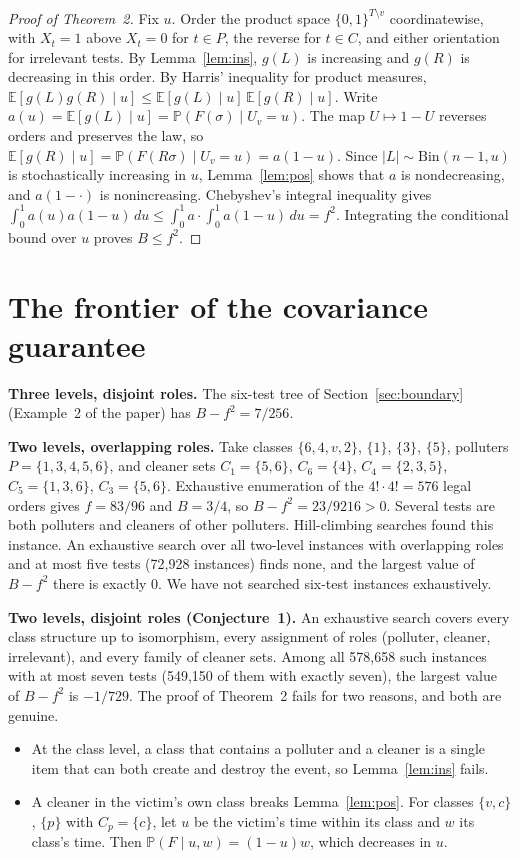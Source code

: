 \documentclass[11pt,a4paper]{article}
\theoremstyle{definition}\newtheorem{definition}[theorem]{Definition}
\theoremstyle{remark}\newtheorem{remark}[theorem]{Remark}
\newcommand{\E}{\mathbb E}
\newcommand{\Prb}{\mathbb P}
\theoremstyle{definition}\newtheorem{xexample}[xtheorem]{Example}\theoremstyle{plain}
\begin{document}
\begin{proof}[Proof of Theorem~2]
Fix $u$. Order the product space $\{0,1\}^{T\setminus v}$ coordinatewise, with $X_t=1$ above $X_t=0$ for $t\in P$, the reverse for $t\in C$, and either orientation for irrelevant tests. By Lemma~\ref{lem:ins}, $g(L)$ is increasing and $g(R)$ is decreasing in this order. By Harris' inequality for product measures, $\E[g(L)g(R)\mid u]\le\E[g(L)\mid u]\,\E[g(R)\mid u]$. Write $a(u)=\E[g(L)\mid u]=\Prb(F(\sigma)\mid U_v=u)$. The map $U\mapsto1-U$ reverses orders and preserves the law, so $\E[g(R)\mid u]=\Prb(F(R\sigma)\mid U_v=u)=a(1-u)$. Since $|L|\sim\mathrm{Bin}(n-1,u)$ is stochastically increasing in $u$, Lemma~\ref{lem:pos} shows that $a$ is nondecreasing, and $a(1-\cdot)$ is nonincreasing. Chebyshev's integral inequality gives $\int_0^1 a(u)a(1-u)\,du\le\int_0^1a\cdot\int_0^1a(1-u)\,du=f^2$. Integrating the conditional bound over $u$ proves $B\le f^2$.
\end{proof}

\section{The frontier of the covariance guarantee}\label{sec:frontier}
\textbf{Three levels, disjoint roles.} The six-test tree of Section~\ref{sec:boundary} (Example~2 of the paper) has $B-f^2=7/256$.

\textbf{Two levels, overlapping roles.} Take classes $\{6,4,v,2\}$, $\{1\}$, $\{3\}$, $\{5\}$, polluters $P=\{1,3,4,5,6\}$, and cleaner sets $C_1=\{5,6\}$, $C_6=\{4\}$, $C_4=\{2,3,5\}$, $C_5=\{1,3,6\}$, $C_3=\{5,6\}$. Exhaustive enumeration of the $4!\cdot4!=576$ legal orders gives $f=83/96$ and $B=3/4$, so $B-f^2=23/9216>0$. Several tests are both polluters and cleaners of other polluters. Hill-climbing searches found this instance. An exhaustive search over all two-level instances with overlapping roles and at most five tests (72{,}928 instances) finds none, and the largest value of $B-f^2$ there is exactly $0$. We have not searched six-test instances exhaustively.

\textbf{Two levels, disjoint roles (Conjecture~1).} An exhaustive search covers every class structure up to isomorphism, every assignment of roles (polluter, cleaner, irrelevant), and every family of cleaner sets. Among all 578{,}658 such instances with at most seven tests (549{,}150 of them with exactly seven), the largest value of $B-f^2$ is $-1/729$. The proof of Theorem~2 fails for two reasons, and both are genuine.
\begin{itemize}
\item At the class level, a class that contains a polluter and a cleaner is a single item that can both create and destroy the event, so Lemma~\ref{lem:ins} fails.
\item A cleaner in the victim's own class breaks Lemma~\ref{lem:pos}. For classes $\{v,c\}$, $\{p\}$ with $C_p=\{c\}$, let $u$ be the victim's time within its class and $w$ its class's time. Then $\Prb(F\mid u,w)=(1-u)w$, which decreases in $u$.
\end{itemize}
\end{document}
